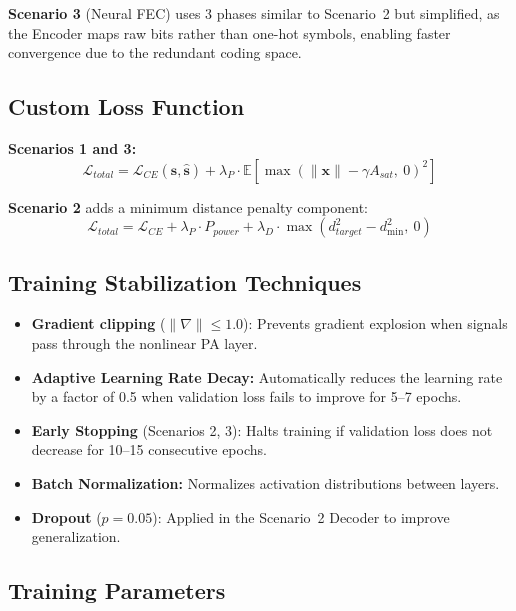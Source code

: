\documentclass[a4paper,14pt]{extreport}
\begin{document}
\textbf{Scenario 3} (Neural FEC) uses 3 phases similar to Scenario~2 but simplified, as the Encoder maps raw bits rather than one-hot symbols, enabling faster convergence due to the redundant coding space.

\subsection{Custom Loss Function}

\textbf{Scenarios 1 and 3:}
\begin{equation}
\mathcal{L}_{total} = \mathcal{L}_{CE}(\mathbf{s}, \hat{\mathbf{s}}) + \lambda_P \cdot \mathbb{E}\left[\max\left(\|\mathbf{x}\| - \gamma A_{sat},\ 0\right)^2\right]
\end{equation}

\textbf{Scenario 2} adds a minimum distance penalty component:
\begin{equation}
\mathcal{L}_{total} = \mathcal{L}_{CE} + \lambda_P \cdot P_{power} + \lambda_D \cdot \max\left(d_{target}^2 - d_{\min}^2,\ 0\right)
\end{equation}

\subsection{Training Stabilization Techniques}

\begin{itemize}
    \item \textbf{Gradient clipping} ($\|\nabla\| \leq 1.0$): Prevents gradient explosion when signals pass through the nonlinear PA layer.
    \item \textbf{Adaptive Learning Rate Decay:} Automatically reduces the learning rate by a factor of 0.5 when validation loss fails to improve for 5--7 epochs.
    \item \textbf{Early Stopping} (Scenarios 2, 3): Halts training if validation loss does not decrease for 10--15 consecutive epochs.
    \item \textbf{Batch Normalization:} Normalizes activation distributions between layers.
    \item \textbf{Dropout} ($p = 0.05$): Applied in the Scenario~2 Decoder to improve generalization.
\end{itemize}

\subsection{Training Parameters}
\end{document}

